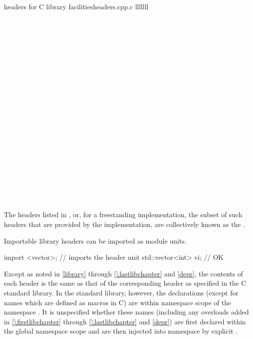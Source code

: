 \begin{multicolfloattable}{\Cpp{} headers for C library facilities}{headers.cpp.c}
{lllllll}
 \\
 \\
 \\
\columnbreak
{} \\
 \\
 \\
\columnbreak
{} \\
 \\
 \\
\columnbreak
{} \\
 \\
 \\
\columnbreak
{} \\
 \\
 \\
\columnbreak
{} \\
 \\
 \\
\columnbreak
{} \\
 \\
 \\
\end{multicolfloattable}

\pnum
The headers listed in , or,
for a freestanding implementation,
the subset of such headers that are provided by the implementation,
are collectively known as
the .
\begin{note}
Importable \Cpp{} library headers can be
imported as module units.
\end{note}
\begin{example}
\begin{codeblock}
import <vector>;                // imports the  header unit
std::vector<int> vi;            // OK
\end{codeblock}
\end{example}

\pnum
Except as noted in \ref{library} through \ref{\lastlibchapter}
and \ref{depr}, the contents of each header  is
the same as that of the corresponding header  as
specified in the C standard library.
In the \Cpp{} standard library, however, the
declarations (except for names which are defined as macros in C) are within
namespace scope of the namespace .
It is unspecified whether these names (including any overloads added in
\ref{\firstlibchapter} through \ref{\lastlibchapter} and \ref{depr})
are first declared within the global namespace scope
and are then injected into namespace  by explicit
.

